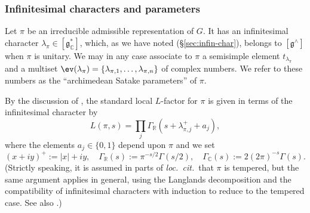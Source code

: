 \subsubsection{Infinitesimal characters and parameters}
Let $\pi$ be an irreducible admissible representation of $G$.  It has an infinitesimal character $\lambda_\pi \in [\mathfrak{g}_{\mathbb{C}}^*]$, which, as we have noted (\S\ref{sec:infin-char}), belongs to $[\mathfrak{g}^\wedge]$ when $\pi$ is unitary.  We may in any case associate to $\pi$ a semisimple element $t_{\lambda_\pi}$ and a multiset $\ev(\lambda_{\pi}) = \{\lambda_{\pi,1},\dotsc, \lambda_{\pi,n}\}$ of complex numbers.  We refer to these numbers as the ``archimedean Satake parameters'' of $\pi$. 

By the discussion of \cite[\S15.4]{nelson-venkatesh-1}, the standard local $L$-factor for $\pi$ is given in terms of the infinitesimal character by
\[
  L(\pi,s) =
  \prod_j \Gamma_\mathbb{R}(s + \lambda_{\pi,j}^+ + a_j),
\]
where the elements $a_j \in \{0, 1\}$ depend upon $\pi$ and we set
\[
  (x + i y)^+ := |x| + i y, \quad \Gamma_\mathbb{R}(s) := \pi^{-s/2} \Gamma(s/2), \quad \Gamma_{\mathbb{C}}(s) := 2 (2 \pi)^{-s} \Gamma(s).
\]
(Strictly speaking, it is assumed in parts of \emph{loc.\ cit.}\ that $\pi$ is tempered, but the same argument applies in general, using the
Langlands decomposition \cite[Theorem 8.54]{MR855239} and the compatibility of infinitesimal characters with induction \cite[Proposition 8.22]{MR855239} to reduce to the tempered case.  See also \cite[Appendix]{MR1395406}.)

